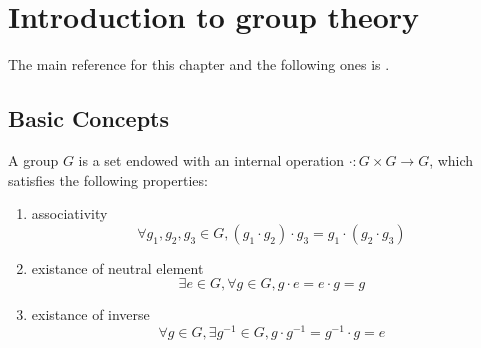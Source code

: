 \chapter{Introduction to group theory}
The main reference for this chapter and the following ones is \cite{Tung1985}.


\section{Basic Concepts}

\begin{definition}[Group]
    A group $G$ is a set endowed with an internal operation $\cdot: G \times G \rightarrow G$, which satisfies the following properties:
    \begin{enumerate}
        \item associativity
        \begin{equation}
            \forall g_1, g_2, g_3 \in G, (g_1 \cdot g_2) \cdot g_3 = g_1 \cdot (g_2 \cdot g_3)
            \label{eq:group_associativity}
        \end{equation}
        \item existance of neutral element
        \begin{equation}
            \exists e \in G, \forall g \in G, g\cdot e = e\cdot g = g
            \label{eq:group_neutral}
        \end{equation}
        \item existance of inverse
        \begin{equation}
            \forall g \in G, \exists g^{-1} \in G, g \cdot g^{-1} = g^{-1} \cdot g = e
            \label{eq:group_inverse}
        \end{equation}
    \end{enumerate}
\end{definition}

